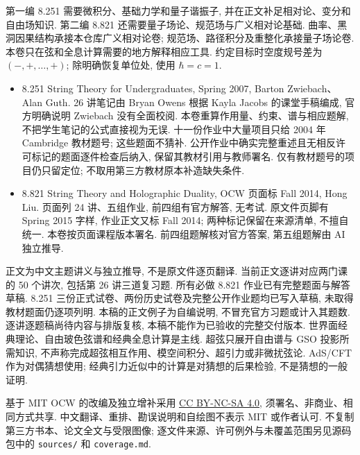 第一编 8.251 需要微积分、基础力学和量子谐振子, 并在正文补足相对论、变分和自由场知识. 第二编 8.821 还需要量子场论、规范场与广义相对论基础. 曲率、黑洞因果结构承接本仓库广义相对论卷; 规范场、路径积分及重整化承接量子场论卷. 本卷只在弦和全息计算需要的地方解释相应工具. 约定目标时空度规号差为 $(-,+,\ldots,+)$; 除明确恢复单位处, 使用 $\hbar=c=1$.

\begin{itemize}
\item 8.251 String Theory for Undergraduates, Spring 2007, Barton Zwiebach、Alan Guth. 26 讲笔记由 Bryan Owens 根据 Kayla Jacobs 的课堂手稿编成, 官方明确说明 Zwiebach 没有全面校阅. 本卷重算作用量、约束、谱与相应题解, 不把学生笔记的公式直接视为无误. 十一份作业中大量项目只给 2004 年 Cambridge 教材题号; 这些题面不猜补. 公开作业中确实完整重述且无相反许可标记的题面逐件检查后纳入, 保留其教材引用与教师署名. 仅有教材题号的项目仍只留定位; 不取用第三方教材原本补造缺失条件.
\item 8.821 String Theory and Holographic Duality, OCW 页面标 Fall 2014, Hong Liu. 页面列 24 讲、五组作业, 前四组有官方解答, 无考试. 原文件页脚有 Spring 2015 字样, 作业正文又标 Fall 2014; 两种标记保留在来源清单, 不擅自统一. 本卷按页面课程版本署名. 前四组题解核对官方答案, 第五组题解由 AI 独立推导.
\end{itemize}

正文为中文主题讲义与独立推导, 不是原文件逐页翻译. 当前正文逐讲对应两门课的 50 个讲次, 包括第 26 讲三道复习题. 所有必做 8.821 作业已有完整题面与解答草稿. 8.251 三份正式试卷、两份历史试卷及完整公开作业题均已写入草稿, 未取得教材题面仍逐项列明. 本稿的正文例子为自编说明, 不冒充官方习题或计入其题数. 逐讲逐题稿尚待内容与排版复核, 本稿不能作为已验收的完整交付版本. 世界面经典理论、自由玻色弦谱和经典全息计算是主线. 超弦只展开自由谱与 GSO 投影所需知识, 不声称完成超弦相互作用、模空间积分、超引力或非微扰弦论. AdS/CFT 作为对偶猜想使用; 经典引力近似中的计算是对猜想的后果检验, 不是猜想的一般证明.

基于 MIT OCW 的改编及独立增补采用 \href{https://creativecommons.org/licenses/by-nc-sa/4.0/}{CC BY-NC-SA 4.0}, 须署名、非商业、相同方式共享. 中文翻译、重排、勘误说明和自绘图不表示 MIT 或作者认可. 不复制第三方书本、论文全文与受限图像; 逐文件来源、许可例外与未覆盖范围另见源码包中的 \texttt{sources/} 和 \texttt{coverage.md}.

